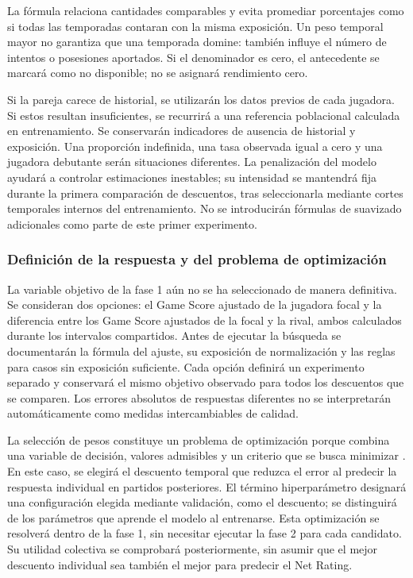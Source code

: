 La fórmula relaciona cantidades comparables y evita promediar porcentajes como si todas las temporadas contaran con la misma exposición. Un peso temporal mayor no garantiza que una temporada domine: también influye el número de intentos o posesiones aportados. Si el denominador es cero, el antecedente se marcará como no disponible; no se asignará rendimiento cero.

Si la pareja carece de historial, se utilizarán los datos previos de cada jugadora. Si estos resultan insuficientes, se recurrirá a una referencia poblacional calculada en entrenamiento. Se conservarán indicadores de ausencia de historial y exposición. Una proporción indefinida, una tasa observada igual a cero y una jugadora debutante serán situaciones diferentes. La penalización del modelo ayudará a controlar estimaciones inestables; su intensidad se mantendrá fija durante la primera comparación de descuentos, tras seleccionarla mediante cortes temporales internos del entrenamiento. No se introducirán fórmulas de suavizado adicionales como parte de este primer experimento.

\subsubsection*{Definición de la respuesta y del problema de optimización}
La variable objetivo de la fase 1 aún no se ha seleccionado de manera definitiva. Se consideran dos opciones: el Game Score ajustado de la jugadora focal y la diferencia entre los Game Score ajustados de la focal y la rival, ambos calculados durante los intervalos compartidos. Antes de ejecutar la búsqueda se documentarán la fórmula del ajuste, su exposición de normalización y las reglas para casos sin exposición suficiente. Cada opción definirá un experimento separado y conservará el mismo objetivo observado para todos los descuentos que se comparen. Los errores absolutos de respuestas diferentes no se interpretarán automáticamente como medidas intercambiables de calidad.

La selección de pesos constituye un problema de optimización porque combina una variable de decisión, valores admisibles y un criterio que se busca minimizar \cite{boyd2004convex}. En este caso, se elegirá el descuento temporal que reduzca el error al predecir la respuesta individual en partidos posteriores. El término hiperparámetro designará una configuración elegida mediante validación, como el descuento; se distinguirá de los parámetros que aprende el modelo al entrenarse. Esta optimización se resolverá dentro de la fase 1, sin necesitar ejecutar la fase 2 para cada candidato. Su utilidad colectiva se comprobará posteriormente, sin asumir que el mejor descuento individual sea también el mejor para predecir el Net Rating.

